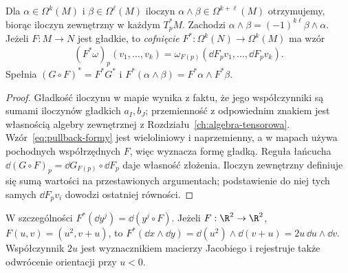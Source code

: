 \begin{stwierdzenie}
\label{prop:formy-wedge-pullback}
Dla $\alpha\in\Omega^k(M)$ i $\beta\in\Omega^\ell(M)$
iloczyn $\alpha\wedge\beta\in\Omega^{k+\ell}(M)$
otrzymujemy, biorąc iloczyn zewnętrzny w każdym
$T_p^*M$. Zachodzi $\alpha\wedge\beta
=(-1)^{k\ell}\beta\wedge\alpha$.
Jeżeli $F:M\to N$ jest gładkie, to \emph{cofnięcie}
$F^*:\Omega^k(N)\to\Omega^k(M)$ ma wzór
\begin{equation}\label{eq:pullback-formy}
 (F^*\omega)_p(v_1,\ldots,v_k)
 =\omega_{F(p)}(\dd F_pv_1,\ldots,\dd F_pv_k).
\end{equation}
Spełnia $(G\circ F)^*=F^*G^*$ i
$F^*(\alpha\wedge\beta)=F^*\alpha\wedge F^*\beta$.
\end{stwierdzenie}
\begin{proof}
Gładkość iloczynu w mapie wynika z faktu, że jego
współczynniki są sumami iloczynów gładkich $a_I,b_J$;
przemienność z odpowiednim znakiem jest własnością
algebry zewnętrznej z Rozdziału~\ref{ch:algebra-tensorowa}.
Wzór~\eqref{eq:pullback-formy} jest wieloliniowy i
naprzemienny, a w mapach używa pochodnych współrzędnych
$F$, więc wyznacza formę gładką. Reguła łańcucha
$\dd(G\circ F)_p=\dd G_{F(p)}\circ\dd F_p$
daje własność złożenia. Iloczyn zewnętrzny definiuje
się sumą wartości na przestawionych argumentach; podstawienie
do niej tych samych $\dd F_pv_i$ dowodzi ostatniej równości.
\end{proof}

W szczególności $F^*(\dd y^j)=\dd(y^j\circ F)$.
Jeżeli $F:\R^2\to\R^2$, $F(u,v)=(u^2,v+u)$,
to $F^*(\dd x\wedge\dd y)
=\dd(u^2)\wedge\dd(v+u)=2u\,\dd u\wedge\dd v$.
Współczynnik $2u$ jest wyznacznikiem macierzy Jacobiego
i rejestruje także odwrócenie orientacji przy $u<0$.

